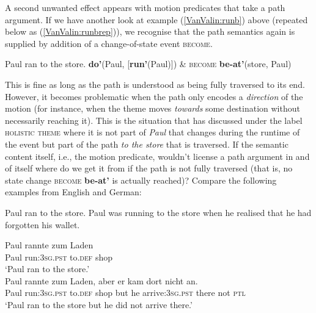 A second unwanted effect appears with motion predicates that take a path argument. If we have another look at example (\ref{VanValin:runb}) above (repeated below as (\ref{VanValin:runbrep})), we recognise that the path semantics again is supplied by addition of a change-of-state event \textsc{become}. 

\ea \label{VanValin:runbrep}
\ea Paul ran to the store. 
\ex \textbf{do'}(Paul, [\textbf{run'}(Paul)]) \& \textsc{become} \textbf{be-at'}(store, Paul)
\z
\z

This is fine as long as the path is understood as being fully traversed to its end. However, it becomes problematic when the path only encodes a \emph{direction} of the motion (for instance, when the theme moves \textit{towards} some destination without necessarily reaching it). This is the situation that \citet[569]{dowty1991thematic} has discussed under the label \textsc{holistic theme} where it is not part of \textit{Paul} that changes during the runtime of the event but part of the path \textit{to the store} that is traversed. If the semantic content itself, i.e., the motion predicate, wouldn't license a path argument in and of itself where do we get it from if the path is not fully traversed (that is, no state change \textsc{become} \textbf{be-at'} is actually reached)?  Compare the following examples from English and German:

\ea
\ea Paul ran to the store.\label{runstorea}
\ex Paul was running to the store when he realised that he had forgotten his wallet.\label{runstoreb}
\z
\z

\ea 
\ea \label{runstoreag}
\gll Paul rannte zum Laden\\
Paul run:\textsc{3}\textsc{sg}.\textsc{pst} to.\textsc{def} shop \\
\glft `Paul ran to the store.'\\
\ex \label{runstorebg}
\gll Paul rannte zum Laden, aber er kam dort nicht an.\\
Paul run:\textsc{3}\textsc{sg}.\textsc{pst} to.\textsc{def} shop but he arrive:\textsc{3}\textsc{sg}.\textsc{pst} there not \textsc{ptl} \\
\glft `Paul ran to the store but he did not arrive there.'\\
\z
\z

